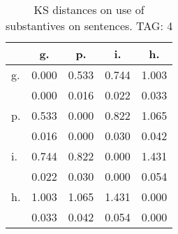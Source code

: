 \begin{table}[h!]
\begin{center}
\begin{tabular}{| l | c | c | c | c |}\hline
 & g. & p. & i. & h. \\\hline
g. & 0.000  & 0.533  & 0.744  & 1.003 \\\hline
 & 0.000  & 0.016  & 0.022  & 0.033 \\\hline
p. & 0.533  & 0.000  & 0.822  & 1.065 \\\hline
 & 0.016  & 0.000  & 0.030  & 0.042 \\\hline
i. & 0.744  & 0.822  & 0.000  & 1.431 \\\hline
 & 0.022  & 0.030  & 0.000  & 0.054 \\\hline
h. & 1.003  & 1.065  & 1.431  & 0.000 \\\hline
 & 0.033  & 0.042  & 0.054  & 0.000 \\\hline
\end{tabular}
\caption{KS distances on use of substantives on sentences. TAG: 4}
\end{center}
\end{table}